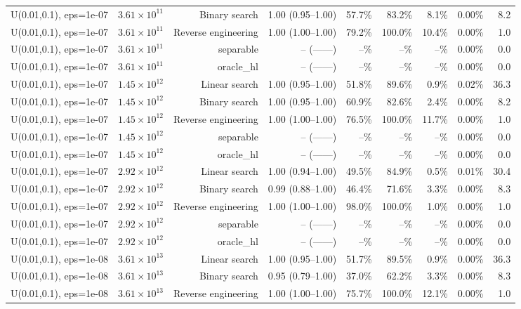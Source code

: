 \begin{tabular}{llrrrrrrr}
U(0.01,0.1), eps=1e-07 & $3.61\times 10^{11}$ & Binary search & 1.00 (0.95--1.00) & 57.7\% & 83.2\% & 8.1\% & 0.00\% & 8.2 \\
U(0.01,0.1), eps=1e-07 & $3.61\times 10^{11}$ & Reverse engineering & 1.00 (1.00--1.00) & 79.2\% & 100.0\% & 10.4\% & 0.00\% & 1.0 \\
U(0.01,0.1), eps=1e-07 & $3.61\times 10^{11}$ & separable & -- (------) & --\% & --\% & --\% & 0.00\% & 0.0 \\
U(0.01,0.1), eps=1e-07 & $3.61\times 10^{11}$ & oracle_hl & -- (------) & --\% & --\% & --\% & 0.00\% & 0.0 \\
U(0.01,0.1), eps=1e-07 & $1.45\times 10^{12}$ & Linear search & 1.00 (0.95--1.00) & 51.8\% & 89.6\% & 0.9\% & 0.02\% & 36.3 \\
U(0.01,0.1), eps=1e-07 & $1.45\times 10^{12}$ & Binary search & 1.00 (0.95--1.00) & 60.9\% & 82.6\% & 2.4\% & 0.00\% & 8.2 \\
U(0.01,0.1), eps=1e-07 & $1.45\times 10^{12}$ & Reverse engineering & 1.00 (1.00--1.00) & 76.5\% & 100.0\% & 11.7\% & 0.00\% & 1.0 \\
U(0.01,0.1), eps=1e-07 & $1.45\times 10^{12}$ & separable & -- (------) & --\% & --\% & --\% & 0.00\% & 0.0 \\
U(0.01,0.1), eps=1e-07 & $1.45\times 10^{12}$ & oracle_hl & -- (------) & --\% & --\% & --\% & 0.00\% & 0.0 \\
U(0.01,0.1), eps=1e-07 & $2.92\times 10^{12}$ & Linear search & 1.00 (0.94--1.00) & 49.5\% & 84.9\% & 0.5\% & 0.01\% & 30.4 \\
U(0.01,0.1), eps=1e-07 & $2.92\times 10^{12}$ & Binary search & 0.99 (0.88--1.00) & 46.4\% & 71.6\% & 3.3\% & 0.00\% & 8.3 \\
U(0.01,0.1), eps=1e-07 & $2.92\times 10^{12}$ & Reverse engineering & 1.00 (1.00--1.00) & 98.0\% & 100.0\% & 1.0\% & 0.00\% & 1.0 \\
U(0.01,0.1), eps=1e-07 & $2.92\times 10^{12}$ & separable & -- (------) & --\% & --\% & --\% & 0.00\% & 0.0 \\
U(0.01,0.1), eps=1e-07 & $2.92\times 10^{12}$ & oracle_hl & -- (------) & --\% & --\% & --\% & 0.00\% & 0.0 \\
U(0.01,0.1), eps=1e-08 & $3.61\times 10^{13}$ & Linear search & 1.00 (0.95--1.00) & 51.7\% & 89.5\% & 0.9\% & 0.00\% & 36.3 \\
U(0.01,0.1), eps=1e-08 & $3.61\times 10^{13}$ & Binary search & 0.95 (0.79--1.00) & 37.0\% & 62.2\% & 3.3\% & 0.00\% & 8.3 \\
U(0.01,0.1), eps=1e-08 & $3.61\times 10^{13}$ & Reverse engineering & 1.00 (1.00--1.00) & 75.7\% & 100.0\% & 12.1\% & 0.00\% & 1.0 \\

\end{tabular}
